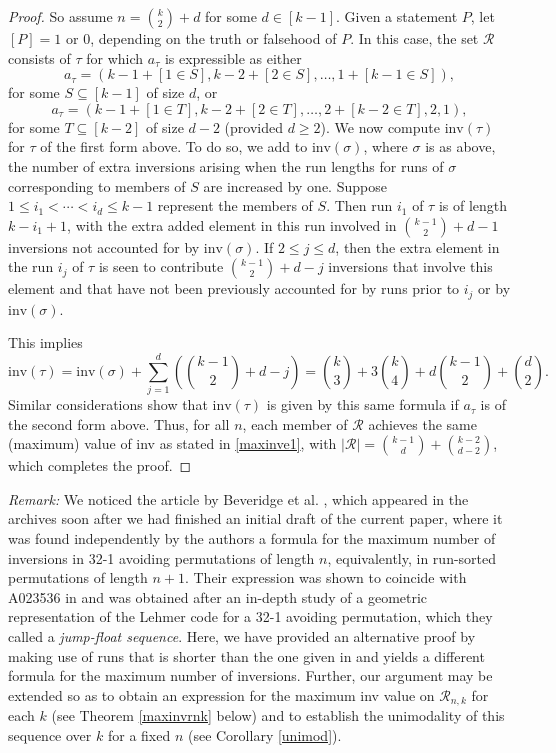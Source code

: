 \documentclass[11pt,a4paper]{article}
\begin{document}
\begin{proof}
 So assume $n=\binom{k}{2}+d$ for some $d \in [k-1]$.  Given a statement $P$, let $[P]=1$ or $0$, depending on the truth or falsehood of $P$.  In this case, the set $\mathcal{R}$ consists of $\tau$ for which $a_\tau$ is expressible as either
 $$a_\tau=(k-1+[1 \in S],k-2+[2 \in S],\ldots,1+[k-1 \in S]),$$
 for some $S \subseteq [k-1]$ of size $d$, or
 $$a_\tau=(k-1+[1 \in T],k-2+[2\in T],\ldots,2+[k-2 \in T],2,1),$$
 for some $T \subseteq [k-2]$ of size $d-2$ (provided $d \geq 2$).  We now compute $\text{inv}(\tau)$ for $\tau$ of the first form above.  To do so, we add to $\text{inv}(\sigma)$, where $\sigma$ is as above, the number of extra inversions arising when the run lengths for runs of $\sigma$ corresponding to members of $S$ are increased by one. Suppose $1 \leq i_1<\cdots<i_d \leq k-1$ represent the members of $S$.  Then run $i_1$ of $\tau$ is of length $k-i_1+1$, with the extra added element in this run involved in $\binom{k-1}{2}+d-1$ inversions not accounted for by $\text{inv}(\sigma)$.  If $2 \leq j \leq d$, then the extra element in the run $i_j$ of $\tau$ is seen to contribute $\binom{k-1}{2}+d-j$ inversions that involve this element and that have not been previously accounted for by runs prior to $i_j$ or by $\text{inv}(\sigma)$.

 This implies
 $$\text{inv}(\tau)=\text{inv}(\sigma)+\sum_{j=1}^d\left(\binom{k-1}{2}+d-j\right)=\binom{k}{3}+3\binom{k}{4}+d\binom{k-1}{2}+\binom{d}{2}.$$
 Similar considerations show that $\text{inv}(\tau)$ is given by this same formula if $a_\tau$ is of the second form above.  Thus, for all $n$, each member of $\mathcal{R}$ achieves the same (maximum) value of inv as stated in \eqref{maxinve1}, with $|\mathcal{R}|=\binom{k-1}{d}+\binom{k-2}{d-2}$,  which completes the proof.
 \end{proof}


 \noindent \emph{Remark:}  We noticed the article by Beveridge et al. \cite{Bev}, which appeared in the archives soon after we had finished an initial draft of the current paper, where it was found independently by the authors a formula for the maximum number of inversions in 32-1 avoiding permutations of length $n$, equivalently, in run-sorted permutations of length $n+1$.  Their expression was shown to coincide with A023536 in \cite{Sl} and was obtained after an in-depth study of a geometric representation of the Lehmer code for a 32-1 avoiding permutation, which they called a \emph{jump-float sequence}. Here, we have provided an alternative proof by making use of runs that is shorter than the one given in \cite{Bev} and yields a different formula for the maximum number of inversions.  Further, our argument may be extended so as to obtain an expression for the maximum inv value on $\mathcal{R}_{n,k}$ for each $k$ (see Theorem \ref{maxinvrnk} below) and to establish the unimodality of this sequence over $k$ for a fixed $n$ (see Corollary \ref{unimod}). \medskip
\end{document}
